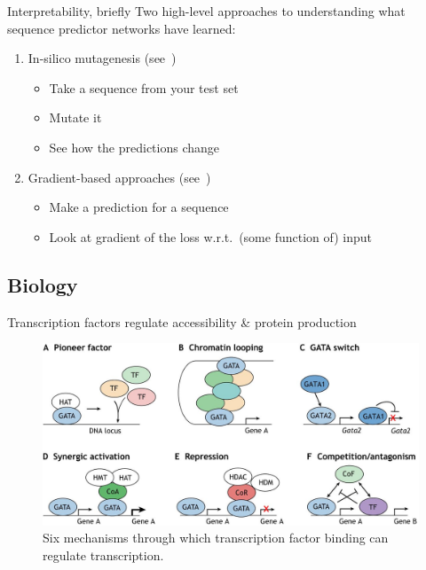\documentclass[pdf]{beamer} %
\begin{document}
\begin{frame}[t]{Interpretability, briefly}
    Two high-level approaches to understanding what sequence predictor networks have learned:
    \begin{enumerate}
        \item In-silico mutagenesis (see~\cite{zhou2015predicting, kelley2016basset})
            \begin{itemize}
                \item Take a sequence from your test set
                \item Mutate it
                \item See how the predictions change
            \end{itemize}
        \item Gradient-based approaches (see~\cite{Shrikumar2017-uj, Simonyan2013-xy})
            \begin{itemize}
                \item Make a prediction for a sequence
                \item Look at gradient of the loss w.r.t.\ (some function of) input
            \end{itemize}
    \end{enumerate}
\end{frame}

\subsection{Biology}
\begin{frame}[t]{Transcription factors regulate accessibility \& protein production}
    \begin{figure}[htpb]
        \centering
        \includegraphics[width=0.8\linewidth]{figures/tf_explanation}
        \caption{Six mechanisms through which transcription factor binding can regulate transcription\cite{Tremblay2018-ds}.}
        \label{fig:tf_explanation}
    \end{figure} 
\end{frame}
\end{document}
